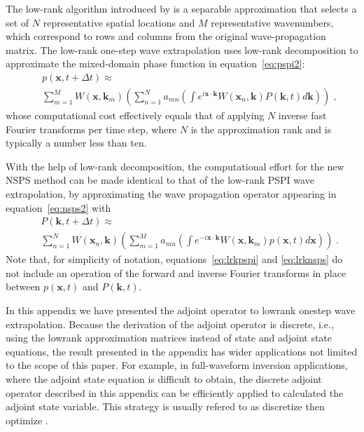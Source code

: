 The low-rank algorithm introduced by \cite{lowrank} is a separable approximation that selects a set of $N$ representative spatial locations and $M$ representative wavenumbers, which correspond to rows and columns from the original wave-propag\-ation matrix. The low-rank one-step wave extrapolation uses low-rank decomposition to approximate the mixed-domain phase function in equation~\ref{eq:pspi2}:
\begin{eqnarray}
\label{eq:lrkpspi}
&& p(\mathbf{x},t+\Delta t) \approx \\
&& \sum\limits_{m=1}^M W(\mathbf{x},\mathbf{k}_m) \left( \sum\limits_{n=1}^N a_{mn} \left(\int e^{i \mathbf{x} \cdot \mathbf{k}} W(\mathbf{x}_n,\mathbf{k}) P(\mathbf{k},t) d\mathbf{k} \right) \right)\; , \nonumber 
\end{eqnarray}
whose computational cost effectively equals that of applying $N$ inverse fast Fourier transforms per time step, where $N$ is the approximation rank and is typically a number less than ten.

With the help of low-rank decomposition, the computational effort for the new NSPS method can be made identical to that of the low-rank PSPI wave extrapolation, by approximating the wave propagation operator appearing in equation~\ref{eq:nsps2} with
\begin{eqnarray}
\label{eq:lrknsps}
&& P(\mathbf{k},t+\Delta t) \approx \\
&& \sum\limits_{n=1}^N W(\mathbf{x}_n,\mathbf{k}) \left( \sum\limits_{m=1}^M a_{mn} \left(\int e^{-i \mathbf{x} \cdot \mathbf{k}} W(\mathbf{x},\mathbf{k}_m) p(\mathbf{x},t) d\mathbf{x} \right) \right)\; . \nonumber 
\end{eqnarray}
Note that, for simplicity of notation, equations~\ref{eq:lrkpspi} and \ref{eq:lrknsps} do not include an operation of the forward and inverse Fourier transforms in place between $p(\mathbf{x},t)$ and $P(\mathbf{k},t)$. 

In this appendix we have presented the adjoint operator to lowrank onestep wave extrapolation. Because the derivation of the adjoint operator is discrete, i.e., using the lowrank approximation matrices instead of state and adjoint state equations, the result presented in the appendix has wider applications not limited to the scope of this paper. For example, in full-waveform inversion applications, where the adjoint state equation is difficult to obtain, the discrete adjoint operator described in this appendix can be efficiently applied to calculated the adjoint state variable. This strategy is usually refered to as discretize then optimize \cite[]{betts2010practical}.



